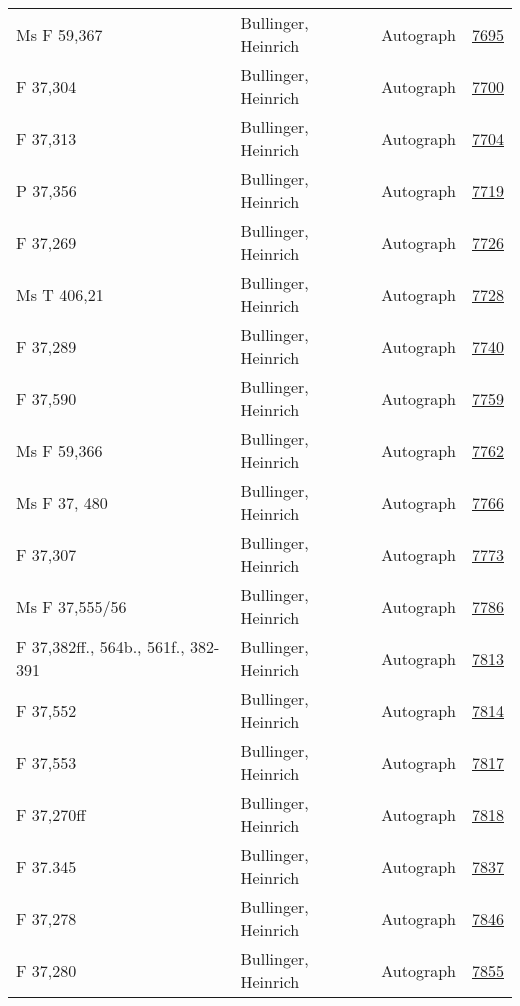 \documentclass[10pt,a4paper,landscape]{report}
\begin{document}
\begin{longtable}{p{16cm}p{4cm}lr}
Ms F 59,367	&	Bullinger, Heinrich	&	Autograph	&	\href{http://130.60.24.72/assignment/7695}{7695}\\
F 37,304	&	Bullinger, Heinrich	&	Autograph	&	\href{http://130.60.24.72/assignment/7700}{7700}\\
F 37,313	&	Bullinger, Heinrich	&	Autograph	&	\href{http://130.60.24.72/assignment/7704}{7704}\\
P 37,356	&	Bullinger, Heinrich	&	Autograph	&	\href{http://130.60.24.72/assignment/7719}{7719}\\
F 37,269	&	Bullinger, Heinrich	&	Autograph	&	\href{http://130.60.24.72/assignment/7726}{7726}\\
Ms T 406,21	&	Bullinger, Heinrich	&	Autograph	&	\href{http://130.60.24.72/assignment/7728}{7728}\\
F 37,289	&	Bullinger, Heinrich	&	Autograph	&	\href{http://130.60.24.72/assignment/7740}{7740}\\
F 37,590	&	Bullinger, Heinrich	&	Autograph	&	\href{http://130.60.24.72/assignment/7759}{7759}\\
Ms F 59,366	&	Bullinger, Heinrich	&	Autograph	&	\href{http://130.60.24.72/assignment/7762}{7762}\\
Ms F 37, 480	&	Bullinger, Heinrich	&	Autograph	&	\href{http://130.60.24.72/assignment/7766}{7766}\\
F 37,307	&	Bullinger, Heinrich	&	Autograph	&	\href{http://130.60.24.72/assignment/7773}{7773}\\
Ms F 37,555/56	&	Bullinger, Heinrich	&	Autograph	&	\href{http://130.60.24.72/assignment/7786}{7786}\\
F 37,382ff., 564b., 561f., 382-391	&	Bullinger, Heinrich	&	Autograph	&	\href{http://130.60.24.72/assignment/7813}{7813}\\
F 37,552	&	Bullinger, Heinrich	&	Autograph	&	\href{http://130.60.24.72/assignment/7814}{7814}\\
F 37,553	&	Bullinger, Heinrich	&	Autograph	&	\href{http://130.60.24.72/assignment/7817}{7817}\\
F 37,270ff	&	Bullinger, Heinrich	&	Autograph	&	\href{http://130.60.24.72/assignment/7818}{7818}\\
F 37.345	&	Bullinger, Heinrich	&	Autograph	&	\href{http://130.60.24.72/assignment/7837}{7837}\\
F 37,278	&	Bullinger, Heinrich	&	Autograph	&	\href{http://130.60.24.72/assignment/7846}{7846}\\
F 37,280	&	Bullinger, Heinrich	&	Autograph	&	\href{http://130.60.24.72/assignment/7855}{7855}\\

\end{longtable}
\end{document}
